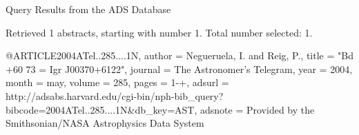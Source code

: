 Query Results from the ADS Database


Retrieved 1 abstracts, starting with number 1.  Total number selected: 1.

@ARTICLE{2004ATel..285....1N,
   author = {{Negueruela}, I. and {Reig}, P.},
    title = "{Bd +60 73 = Igr J00370+6122}",
  journal = {The Astronomer's Telegram},
     year = 2004,
    month = may,
   volume = 285,
    pages = {1-+},
   adsurl = {http://adsabs.harvard.edu/cgi-bin/nph-bib_query?bibcode=2004ATel..285....1N&db_key=AST},
  adsnote = {Provided by the Smithsonian/NASA Astrophysics Data System}
}


